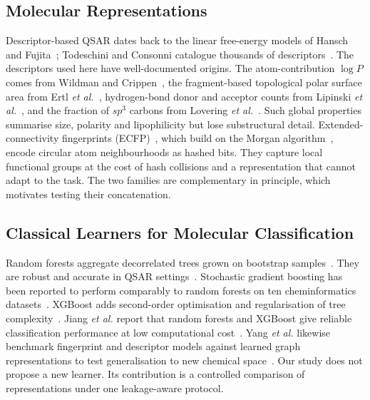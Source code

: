 \documentclass[conference]{IEEEtran}
\begin{document}
\subsection{Molecular Representations}
Descriptor-based QSAR dates back to the linear free-energy models of Hansch and Fujita~\cite{hansch1964rho}; Todeschini and Consonni catalogue thousands of descriptors~\cite{todeschini2009descriptors}. The descriptors used here have well-documented origins. The atom-contribution $\log P$ comes from Wildman and Crippen~\cite{wildman1999logp}, the fragment-based topological polar surface area from Ertl \textit{et al.}~\cite{ertl2000tpsa}, hydrogen-bond donor and acceptor counts from Lipinski \textit{et al.}~\cite{lipinski1997rule}, and the fraction of $sp^3$ carbons from Lovering \textit{et al.}~\cite{lovering2009flatland}. Such global properties summarise size, polarity and lipophilicity but lose substructural detail. Extended-connectivity fingerprints (ECFP)~\cite{rogers2010ecfp}, which build on the Morgan algorithm~\cite{morgan1965generation}, encode circular atom neighbourhoods as hashed bits. They capture local functional groups at the cost of hash collisions and a representation that cannot adapt to the task. The two families are complementary in principle, which motivates testing their concatenation.

\subsection{Classical Learners for Molecular Classification}
Random forests aggregate decorrelated trees grown on bootstrap samples~\cite{breiman2001random}. They are robust and accurate in QSAR settings~\cite{svetnik2003random}. Stochastic gradient boosting has been reported to perform comparably to random forests on ten cheminformatics datasets~\cite{svetnik2005boosting}. XGBoost adds second-order optimisation and regularisation of tree complexity~\cite{chen2016xgboost}. Jiang \textit{et al.} report that random forests and XGBoost give reliable classification performance at low computational cost~\cite{jiang2021could}. Yang \textit{et al.} likewise benchmark fingerprint and descriptor models against learned graph representations to test generalisation to new chemical space~\cite{yang2019analyzing}. Our study does not propose a new learner. Its contribution is a controlled comparison of representations under one leakage-aware protocol.
\end{document}
